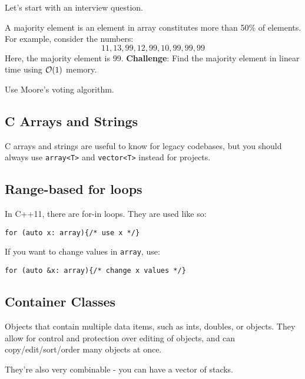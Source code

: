 Let's start with an interview question.

A majority element is an element in array constitutes more than 50\% of elements. For example, consider the numbers:
$$11,13,99,12,99,10,99,99,99$$
Here, the majority element is 99. \textbf{Challenge}: Find the majority element in linear time using $\mathcal{O}(1)$ memory. 

Use Moore's voting algorithm.

\subsection{C Arrays and Strings}
C arrays and strings are useful to know for legacy codebases, but you should always use \lstinline[style=C++]{array<T>} and \lstinline[style=C++]{vector<T>} instead for projects.

\subsection{Range-based for loops}
In C++11, there are for-in loops. They are used like so:
\begin{lstlisting}[style=C++]
for (auto x: array){/* use x */}
\end{lstlisting}
If you want to change values in \lstinline[style=C++]{array}, use:
\begin{lstlisting}[style=C++]
for (auto &x: array){/* change x values */}
\end{lstlisting}

\subsection{Container Classes}
Objects that contain multiple data items, such as ints, doubles, or objects. They allow for control and protection over editing of objects, and can copy/edit/sort/order many objects at once.

They're also very combinable - you can have a vector of stacks.